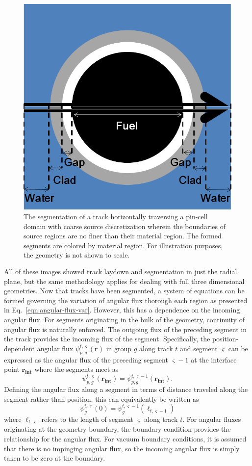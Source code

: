 \begin{figure}[h!]
	\centering
	\includegraphics[width=0.6\linewidth]{figures/segmentation.PNG}
	\caption[]{The segmentation of a track horizontally traversing a pin-cell domain with coarse source discretization wherein the boundaries of source regions are no finer than their material region. The formed segments are colored by material region. For illustration purposes, the geometry is not shown to scale.}
	\label{fig:segmentation}
\end{figure}

All of these images showed track laydown and segmentation in just the radial plane, but the same methodology applies for dealing with full three dimensional geometries. Now that tracks have been segmented, a system of equations can be formed governing the variation of angular flux thorough each region as presented in Eq.~\ref{eqn:angular-flux-var}. However, this has a dependence on the incoming angular flux. For segments originating in the bulk of the geometry, continuity of angular flux is naturally enforced. The outgoing flux of the preceding segment in the track provides the incoming flux of the segment. Specifically, the position-dependent angular flux $\psi_{p,g}^{t,\varsigma}(\mathbf{r})$ in group $g$ along track $t$ and segment $\varsigma$ can be expressed as the angular flux of the preceding segment $\varsigma-1$ at the interface point $\mathbf{r_{\textbf{int}}}$ where the segments meet as
\begin{dmath}
	\psi_{p,g}^{t,\varsigma}(\mathbf{r_{\textbf{int}}}) = \psi_{p,g}^{t,\varsigma-1}(\mathbf{r_{\textbf{int}}}).
\end{dmath}
Defining the angular flux along a segment in terms of distance traveled along the segment rather than position, this can equivalently be written as
\begin{dmath}
	\psi_g^{t,\varsigma}(0) = \psi_g^{t,\varsigma-1}(\ell_{t,\varsigma-1})
	\label{eqn:angular_flux_boundary}
\end{dmath}
where $\ell_{t,\varsigma}$ refers to the length of segment $\varsigma$ along track $t$. For angular fluxes originating at the geometry boundary, the boundary condition provides the relationship for the angular flux. For vacuum boundary conditions, it is assumed that there is no impinging angular flux, so the incoming angular flux is simply taken to be zero at the boundary. 


